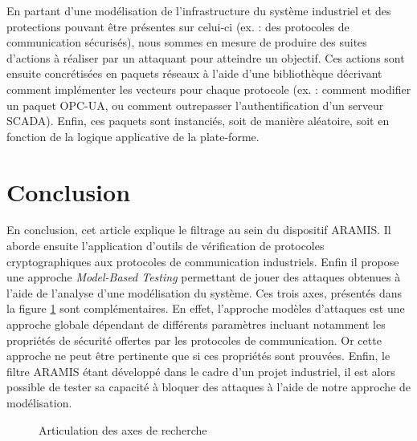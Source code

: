 \documentclass{article}
\newcommand{\ex}{ex. :\xspace}
\newcommand{\aramis}{ARAMIS\xspace}
\newcommand{\opcua}{OPC-UA\xspace}
\begin{document}
En partant d'une modélisation de l'infrastructure du système industriel et des
protections pouvant être présentes sur celui-ci (\ex des protocoles de
communication sécurisés), nous sommes en mesure de produire des suites d'actions
à réaliser par un attaquant pour atteindre un objectif.
Ces actions sont ensuite concrétisées en paquets réseaux à l'aide d'une
bibliothèque décrivant comment implémenter les vecteurs 
pour chaque protocole (\ex comment modifier un paquet \opcua, ou comment
outrepasser l'authentification d'un serveur SCADA).
Enfin, ces paquets sont instanciés, soit de manière aléatoire, soit en fonction
de la logique applicative de la plate-forme.

\section{Conclusion}\label{sec:concl}

En conclusion, cet article explique le filtrage au sein du dispositif \aramis.
Il aborde ensuite l'application d'outils de vérification de protocoles
cryptographiques aux protocoles de communication industriels.
Enfin il propose une approche {\em Model-Based Testing} permettant de jouer
des attaques obtenues à l'aide de l'analyse d'une modélisation du système.
Ces trois axes, présentés dans la figure \ref{fig:thesis} sont complémentaires.
En effet, l'approche modèles d'attaques est une approche globale dépendant de
différents paramètres incluant notamment les propriétés de sécurité offertes par les
protocoles de communication.
Or cette approche ne peut être pertinente que si ces propriétés sont prouvées.
Enfin, le filtre \aramis étant développé dans le cadre d'un projet industriel,
il est alors possible de tester sa capacité à bloquer des attaques à l'aide
de notre approche de modélisation.

\begin{figure}[htb]
    \centering
    \resizebox{.85\textwidth}{!}{
        
    }
    \caption{Articulation des axes de recherche}
    \label{fig:thesis}
\end{figure}



%



\end{document}
